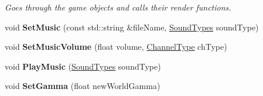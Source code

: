\begin{DoxyCompactItemize}
\begin{DoxyCompactList}\small\item\em Goes through the game objects and calls their render functions. \end{DoxyCompactList}\item 
\hypertarget{class_universe_aecd0ba77180dcc045a2d31e7ef64b3e9}{void {\bfseries Set\-Music} (const std\-::string \&file\-Name, \hyperlink{_audio_8h_ad6c201b2d4894f8a7b43d7a07bbac991}{Sound\-Types} sound\-Type)}\label{class_universe_aecd0ba77180dcc045a2d31e7ef64b3e9}

\item 
\hypertarget{class_universe_a4152ffb33daa42b2c188ed7347f809e6}{void {\bfseries Set\-Music\-Volume} (float volume, \hyperlink{_audio_8h_a19a96edeeb9d37072c4ce9f862d19ba8}{Channel\-Type} ch\-Type)}\label{class_universe_a4152ffb33daa42b2c188ed7347f809e6}

\item 
\hypertarget{class_universe_a8b39d002becbb8b6d7843472cba841ac}{void {\bfseries Play\-Music} (\hyperlink{_audio_8h_ad6c201b2d4894f8a7b43d7a07bbac991}{Sound\-Types} sound\-Type)}\label{class_universe_a8b39d002becbb8b6d7843472cba841ac}

\item 
\hypertarget{class_universe_a294abbc29adcdb9d92b1e9a31605d952}{void {\bfseries Set\-Gamma} (float new\-World\-Gamma)}\label{class_universe_a294abbc29adcdb9d92b1e9a31605d952}

\end{DoxyCompactItemize}
